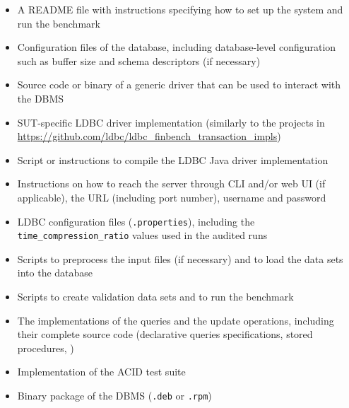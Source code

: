 \begin{itemize}
    \item A README file with instructions specifying how to set up the system and run the benchmark
    \item Configuration files of the database, including database-level configuration such as buffer size and schema descriptors (if necessary)
    \item Source code or binary of a generic driver that can be used to interact with the DBMS
    \item SUT-specific LDBC driver implementation (similarly to the projects in \url{https://github.com/ldbc/ldbc_finbench_transaction_impls})
    \item Script or instructions to compile the LDBC Java driver implementation
    \item Instructions on how to reach the server through CLI and/or web UI (if applicable), \eg the URL (including port number), username and password
    \item LDBC configuration files (\texttt{.properties}), including the \texttt{time\_compression\_ratio} values used in the audited runs
    \item Scripts to preprocess the input files (if necessary) and to load the data sets into the database
    \item Scripts to create validation data sets and to run the benchmark
    \item The implementations of the queries and the update operations, including their complete source code (\eg declarative queries specifications, stored procedures, \etc)
    \item Implementation of the ACID test suite
    \item Binary package of the DBMS (\eg \texttt{.deb} or \texttt{.rpm})
\end{itemize}



